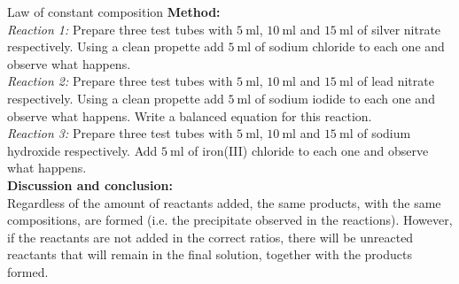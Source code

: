 \begin{Investigation}{Law of constant composition}
\textbf{Method:}\\
\textsl{Reaction 1:} Prepare three test tubes with $5~\text{ml}$, $10~\text{ml}$ and $15~\text{ml}$  of silver nitrate respectively. Using a clean propette add $5~\text{ml}$ of sodium chloride to each one and observe what happens.\\
\textsl{Reaction 2:} Prepare three test tubes with $5~\text{ml}$, $10~\text{ml}$ and $15~\text{ml}$  of lead nitrate respectively. Using a clean propette add $5~\text{ml}$ of sodium iodide to each one and observe what happens. Write a balanced equation for this reaction.\\
\textsl{Reaction 3:} Prepare three test tubes with $5~\text{ml}$, $10~\text{ml}$ and $15~\text{ml}$  of sodium hydroxide respectively. Add $5~\text{ml}$ of iron(III) chloride to each one and observe what happens. \\
\textbf{Discussion and conclusion:} \\
Regardless of the amount of reactants added, the same products, with the same compositions, are formed (i.e. the precipitate observed in the reactions). However, if the reactants are not added in the correct ratios, there will be unreacted reactants that will remain in the final solution, together with the products formed.  
\end{Investigation}

    \label{m38711*cid7}
